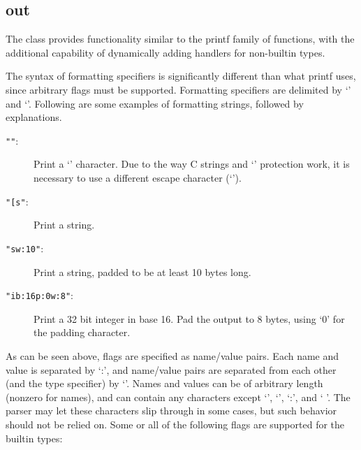 %
%
%
%
%              

\subsection{out}
\label{out}

The  class provides functionality similar to the printf family of
functions, with the additional capability of dynamically adding handlers for
non-builtin types.

The syntax of formatting specifiers is significantly different than what printf
uses, since arbitrary flags must be supported.  Formatting specifiers are
delimited by `{\lb}' and `{\rb}'.  Following are some examples of formatting
strings, followed by explanations.

\begin{description}
\item[{\tt "{\lb}{\lb}"}: ]
	Print a `{\lb}' character.  Due to the way C strings and `{\bs}'
	protection work, it is necessary to use a different escape character
	(`{\lb}').
\item[{\tt "[s{\rb}"}: ]
	Print a string.
\item[{\tt "{\lb}s{\pipe}w:10{\rb}"}: ]
	Print a string, padded to be at least 10 bytes long.
\item[{\tt "{\lb}i{\pipe}b:16{\pipe}p:0{\pipe}w:8{\rb}"}: ]
	Print a 32 bit integer in base 16.  Pad the output to 8 bytes, using `0'
	for the padding character.
\end{description}

As can be seen above, flags are specified as name/value pairs.  Each name and
value is separated by `:', and name/value pairs are separated from each other
(and the type specifier) by `{\pipe}'.  Names and values can be of arbitrary
length (nonzero for names), and can contain any characters except `{\rb}',
`{\pipe}', `:', and ` '.  The parser may let these characters slip through in
some cases, but such behavior should not be relied on.  Some or all of the
following flags are supported for the builtin types:

